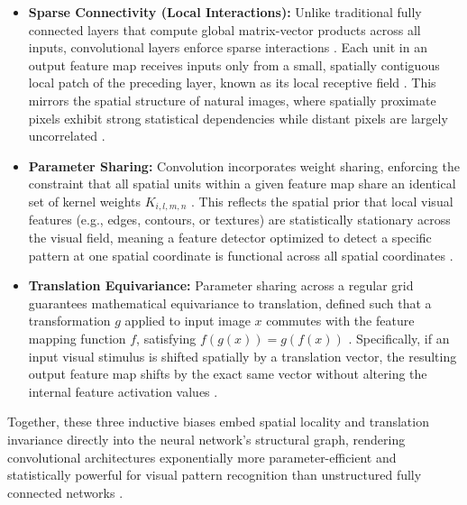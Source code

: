 \begin{itemize}
    \item \textbf{Sparse Connectivity (Local Interactions):} Unlike traditional fully connected layers that compute global matrix-vector products across all inputs, convolutional layers enforce sparse interactions \parencite{Goodfellow-et-al-2016}. Each unit in an output feature map receives inputs only from a small, spatially contiguous local patch of the preceding layer, known as its local receptive field \parencite{Goodfellow-et-al-2016, lecun_backpropagation_1989, lecun_gradient-based_1998}. This mirrors the spatial structure of natural images, where spatially proximate pixels exhibit strong statistical dependencies while distant pixels are largely uncorrelated \parencite{Goodfellow-et-al-2016, lecun_gradient-based_1998}.

    \item \textbf{Parameter Sharing:} Convolution incorporates weight sharing, enforcing the constraint that all spatial units within a given feature map share an identical set of kernel weights $K_{i,l,m,n}$ \parencite{Goodfellow-et-al-2016, lecun_backpropagation_1989, lecun_gradient-based_1998}. This reflects the spatial prior that local visual features (e.g., edges, contours, or textures) are statistically stationary across the visual field, meaning a feature detector optimized to detect a specific pattern at one spatial coordinate is functional across all spatial coordinates \parencite{Goodfellow-et-al-2016, lecun_backpropagation_1989}.

    \item \textbf{Translation Equivariance:} Parameter sharing across a regular grid guarantees mathematical equivariance to translation, defined such that a transformation $g$ applied to input image $x$ commutes with the feature mapping function $f$, satisfying $f(g(x)) = g(f(x))$ \parencite{Goodfellow-et-al-2016}. Specifically, if an input visual stimulus is shifted spatially by a translation vector, the resulting output feature map shifts by the exact same vector without altering the internal feature activation values \parencite{Goodfellow-et-al-2016}.
\end{itemize}

Together, these three inductive biases embed spatial locality and translation invariance directly into the neural network's structural graph, rendering convolutional architectures exponentially more parameter-efficient and statistically powerful for visual pattern recognition than unstructured fully connected networks \parencite{Goodfellow-et-al-2016, lecun_backpropagation_1989, lecun_gradient-based_1998}.

